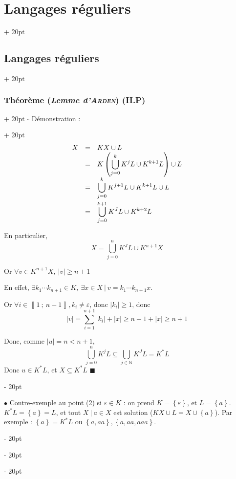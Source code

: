 \documentclass[a4paper, 12pt, twoside]{article}
\newcommand{\N}{\mathbb{N}} %
\newcommand{\nset}[2]{\left\llbracket #1\ ;\ #2 \right\rrbracket}
\newcommand{\lr}[1]{\left( #1 \right)}
\newcommand{\set}[1]{\left\{ #1 \right\}}
\newcommand{\abs}[1]{\left\lvert #1 \right\rvert}
\renewcommand{\ge}{\geqslant}
\newcommand{\ind}[1][20pt]{\advance\leftskip + #1}
\newcommand{\deind}[1][20pt]{\advance\leftskip - #1}
\newenvironment{indt}[2][20pt]{#2 \par \ind[#1]}{\par \deind} %
\newenvironment{proof}[1][{Démonstration :}]{\begin{indt}{$\square$ #1}}{$\blacksquare$ \end{indt}}
\begin{document}
\begin{indt}{\section{Langages réguliers}}
\begin{indt}{\subsection{Langages réguliers}}
\begin{indt}{\subsubsection{Théorème (\textit{Lemme d'\textsc{Arden}}) (H.P)}}
\begin{proof}
                    \[
                        \begin{array}{rcl}
                            X
                            &=& KX \cup L
                            \\
                            &=& \displaystyle K\lr{\bigcup_{j = 0}^k K^j L \cup K^{k + 1}L} \cup L
                            \\
                            &=& \displaystyle \bigcup_{j = 0}^k K^{j + 1} L \cup K^{k + 1} L \cup L
                            \vspace{3pt}
                            \\
                            &=& \displaystyle \bigcup_{j = 0}^{k + 1} K^J L \cup K^{k + 2} L
                        \end{array}
                    \]

                    En particulier,
                    \[
                        X = \bigcup_{j = 0}^n K^J L \cup K^{n + 1} X
                    \]

                    Or $\forall v \in K^{n + 1}X,\ \abs v \ge n + 1$

                    En effet, $\exists k_1 \cdots k_{n + 1} \in K,\ \exists x \in X\ |\ v = k_1 \cdots k_{n + 1} x$.

                    Or $\forall i \in \nset 1 {n + 1}, k_i \neq \varepsilon$, donc $\abs{k_i} \ge 1$, donc
                    \[
                        \abs v = \sum_{i = 1}^{n + 1} \abs{k_i} + \abs x
                        \ge n + 1 + \abs x \ge n + 1
                    \]

                    Donc, comme $\abs u = n < n + 1$,
                    \[
                        \bigcup_{j = 0}^n K^j L \subseteq \bigcup_{j \in \N} K^J L = K^*L
                    \]
                    Donc $u \in K^* L$, et $X \subseteq K^*L$
                \end{proof}

                \vspace{12pt}
                
                $\bullet$ Contre-exemple au point (2) si $\varepsilon \in K$ : on prend $K = \set \varepsilon$, et $L = \set a$.
                $K^*L = \set a = L$, et tout $X\ |\ a \in X$ est solution ($KX\cup L = X \cup \set a$). Par exemple : $\set a = K^*L$ ou $\set{a, aa}, \set{a, aa, aaa}$.
            \end{indt}

            \vspace{12pt}
            

\end{indt}
\end{indt}
\end{document}
